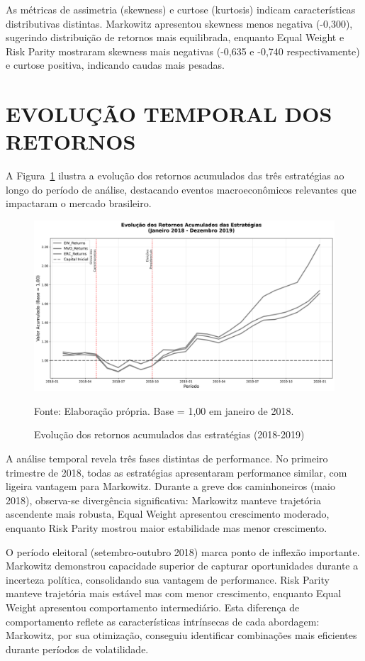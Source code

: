 As métricas de assimetria (skewness) e curtose (kurtosis) indicam características distributivas distintas. Markowitz apresentou skewness menos negativa (-0,300), sugerindo distribuição de retornos mais equilibrada, enquanto Equal Weight e Risk Parity mostraram skewness mais negativas (-0,635 e -0,740 respectivamente) e curtose positiva, indicando caudas mais pesadas.

\section{EVOLUÇÃO TEMPORAL DOS RETORNOS}

A Figura~\ref{fig:retornos_acumulados} ilustra a evolução dos retornos acumulados das três estratégias ao longo do período de análise, destacando eventos macroeconômicos relevantes que impactaram o mercado brasileiro.

\begin{figure}[H]
\centering
\includegraphics[width=\textwidth]{figures/retornos_acumulados_essencial.png}
\caption{Evolução dos retornos acumulados das estratégias (2018-2019)}
\label{fig:retornos_acumulados}
\footnotesize
Fonte: Elaboração própria. Base = 1,00 em janeiro de 2018.
\end{figure}

A análise temporal revela três fases distintas de performance. No primeiro trimestre de 2018, todas as estratégias apresentaram performance similar, com ligeira vantagem para Markowitz. Durante a greve dos caminhoneiros (maio 2018), observa-se divergência significativa: Markowitz manteve trajetória ascendente mais robusta, Equal Weight apresentou crescimento moderado, enquanto Risk Parity mostrou maior estabilidade mas menor crescimento.

O período eleitoral (setembro-outubro 2018) marca ponto de inflexão importante. Markowitz demonstrou capacidade superior de capturar oportunidades durante a incerteza política, consolidando sua vantagem de performance. Risk Parity manteve trajetória mais estável mas com menor crescimento, enquanto Equal Weight apresentou comportamento intermediário. Esta diferença de comportamento reflete as características intrínsecas de cada abordagem: Markowitz, por sua otimização, conseguiu identificar combinações mais eficientes durante períodos de volatilidade.

